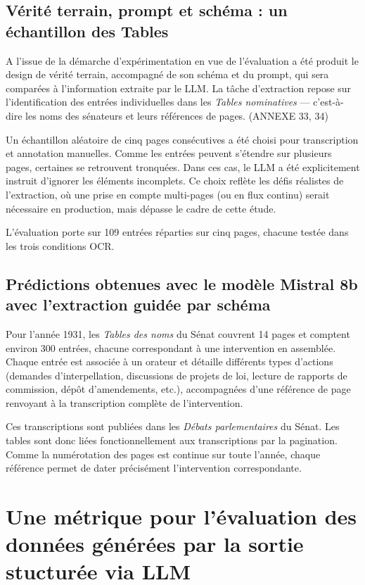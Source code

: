 \subsection{Vérité terrain, prompt et schéma : un échantillon des Tables}

A l'issue de la démarche d'expérimentation en vue de l'évaluation a été produit le design de vérité terrain, accompagné de son schéma et du prompt, qui sera comparées à l'information extraite par le LLM. La tâche d’extraction repose sur l’identification des entrées individuelles dans les \emph{Tables nominatives} — c’est-à-dire les noms des sénateurs et leurs références de pages. (ANNEXE 33, 34)

Un échantillon aléatoire de cinq pages consécutives a été choisi pour transcription et annotation manuelles. Comme les entrées peuvent s’étendre sur plusieurs pages, certaines se retrouvent tronquées. Dans ces cas, le LLM a été explicitement instruit d’ignorer les éléments incomplets. Ce choix reflète les défis réalistes de l’extraction, où une prise en compte multi-pages (ou en flux continu) serait nécessaire en production, mais dépasse le cadre de cette étude.

L’évaluation porte sur 109 entrées réparties sur cinq pages, chacune testée dans les trois conditions OCR.

\subsection{Prédictions obtenues avec le modèle Mistral 8b avec  l'extraction guidée par schéma}

Pour l’année 1931, les \emph{Tables des noms} du Sénat couvrent 14 pages et comptent environ 300 entrées, chacune correspondant à une intervention en assemblée. Chaque entrée est associée à un orateur et détaille différents types d’actions (demandes d’interpellation, discussions de projets de loi, lecture de rapports de commission, dépôt d’amendements, etc.), accompagnées d’une référence de page renvoyant à la transcription complète de l’intervention.

Ces transcriptions sont publiées dans les \emph{Débats parlementaires} du Sénat. Les tables sont donc liées fonctionnellement aux transcriptions par la pagination. Comme la numérotation des pages est continue sur toute l’année, chaque référence permet de dater précisément l’intervention correspondante.

\section{Une métrique pour l'évaluation des données générées par la sortie stucturée via LLM}

